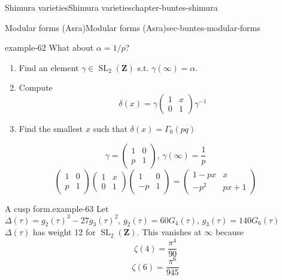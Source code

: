 \documentclass[oneside,10pt,]{book}
\numberwithin{equation}{section}
\newcommand{\inv}{^{-1}}
\newcommand{\ZZ}{\mathbf{Z}}
\DeclareMathOperator{\SL}{SL}
\newcommand{\amp}{&}
\begin{document}
\begin{chapterptx}{Shimura varieties}{}{Shimura varieties}{}{}{chapter-buntes-shimura}
\begin{sectionptx}{Modular forms (Asra)}{}{Modular forms (Asra)}{}{}{sec-buntes-modular-forms}
\begin{example}{}{example-62}
\hypertarget{p-1065}{}%
What about \(\alpha = 1/p\)?\leavevmode%
\begin{enumerate}
\item\hypertarget{li-268}{}Find an element \(\gamma \in \SL_2(\ZZ)\) s.t. \(\gamma(\infty) = \alpha\).%
\item\hypertarget{li-269}{}Compute%
\begin{equation*}
\delta(x) = \gamma \begin{pmatrix} 1\amp x \\ 0 \amp 1 \end{pmatrix} \gamma\inv
\end{equation*}
%
\item\hypertarget{li-270}{}Find the smallest \(x\) such that \(\delta(x) = \Gamma_0(pq)\)%
\end{enumerate}
%
\begin{equation*}
\gamma = \begin{pmatrix} 1\amp 0 \\ p \amp 1 \end{pmatrix},\, \gamma(\infty) = \frac 1p
\end{equation*}
%
\begin{equation*}
\begin{pmatrix} 1\amp 0 \\ p \amp 1 \end{pmatrix} \begin{pmatrix} 1\amp x \\ 0 \amp 1 \end{pmatrix} \begin{pmatrix} 1\amp 0 \\ -p \amp 1 \end{pmatrix}  = \begin{pmatrix} 1 - px \amp x  \\ -p^2 \amp px+ 1 \end{pmatrix}
\end{equation*}
%
\end{example}
\begin{example}{A cusp form.}{example-63}%
\hypertarget{p-1066}{}%
Let \(\Delta(\tau) = g_2(\tau)^3 - 27g_3(\tau)^2,\,g_2(\tau) = 60G_4(\tau),\,g_3(\tau) =140G_6(\tau)\) \(\Delta(\tau)\) has weight 12 for \(\SL_2(\ZZ)\). This vanishes at \(\infty\) because%
\begin{equation*}
\zeta(4) = \frac{\pi^4}{90}
\end{equation*}
%
\begin{equation*}
\zeta(6) = \frac{\pi^6}{945}
\end{equation*}

\end{example}
\end{sectionptx}
\end{chapterptx}
\end{document}
